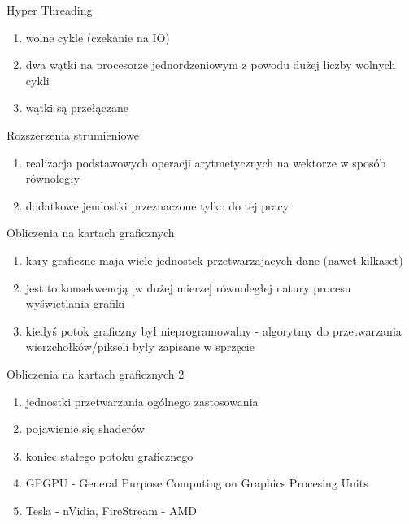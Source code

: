 \documentclass{beamer}
\begin{document}
\begin{frame}{Hyper Threading}
  \begin{enumerate}
  \item wolne cykle (czekanie na IO)
  \item dwa wątki na procesorze jednordzeniowym z powodu dużej liczby wolnych cykli
  \item wątki są przełączane
  \end{enumerate}
\end{frame}

\begin{frame}{Rozszerzenia strumieniowe}
  \begin{enumerate}
  \item realizacja podstawowych operacji arytmetycznych na wektorze w sposób równoległy
  \item dodatkowe jendostki przeznaczone tylko do tej pracy
  \end{enumerate}
\end{frame}

\begin{frame}{Obliczenia na kartach graficznych}
  \begin{enumerate}
  \item kary graficzne maja wiele jednostek przetwarzajacych dane (nawet kilkaset)
  \item jest to konsekwencją [w dużej mierze] równoległej natury procesu wyświetlania grafiki
  \item kiedyś potok graficzny był nieprogramowalny - algorytmy do przetwarzania wierzchołków/pikseli były zapisane w sprzęcie
  \end{enumerate}
\end{frame}

\begin{frame}{Obliczenia na kartach graficznych 2}
  \begin{enumerate}
  \item jednostki przetwarzania ogólnego zastosowania
  \item pojawienie się shaderów
  \item koniec stałego potoku graficznego
  \item GPGPU - General Purpose Computing on Graphics Procesing Units
  \item Tesla - nVidia, FireStream - AMD
  \end{enumerate}
\end{frame}
\end{document}
